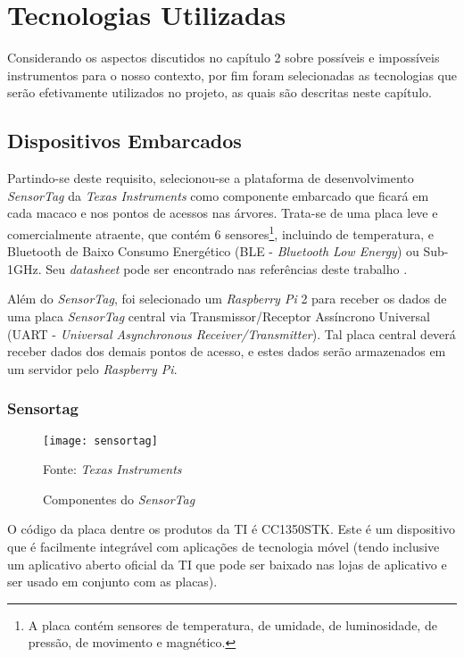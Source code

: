 \chapter{Tecnologias Utilizadas}
Considerando os aspectos discutidos no capítulo 2 sobre possíveis e impossíveis instrumentos para o nosso contexto, por fim foram selecionadas as tecnologias que serão efetivamente utilizados no projeto, as quais são descritas neste capítulo.

\section{Dispositivos Embarcados}

Partindo-se deste requisito, selecionou-se a plataforma de desenvolvimento \emph{SensorTag} da \emph{Texas Instruments} como componente embarcado que ficará em cada macaco e nos pontos de acessos nas árvores. Trata-se de uma placa leve e comercialmente atraente, que contém 6 sensores\footnote{A placa contém sensores de temperatura, de umidade, de luminosidade, de pressão, de movimento e magnético.}, incluindo de temperatura, e Bluetooth de Baixo Consumo Energético (BLE - \emph{Bluetooth Low Energy}) ou Sub-1GHz. Seu \emph{datasheet} pode ser encontrado nas referências deste trabalho \cite{datasheet}.

Além do \emph{SensorTag}, foi selecionado um \emph{Raspberry Pi} 2 para receber os dados de uma placa \emph{SensorTag} central via Transmissor/Receptor Assíncrono Universal (UART - \emph{Universal Asynchronous Receiver/Transmitter}). Tal placa central deverá receber dados dos demais pontos de acesso, e estes dados serão armazenados em um servidor pelo \emph{Raspberry Pi}.

\subsection{Sensortag}

\begin{figure}[ht]
  \centering
  \caption{Componentes do \emph{SensorTag}}
    \texttt{[image: sensortag]}
  \centerline{\small{Fonte: \emph{Texas Instruments}}}
\end{figure}

O código da placa dentre os produtos da TI é CC1350STK. Este é um dispositivo que é facilmente integrável com aplicações de tecnologia móvel (tendo inclusive um aplicativo aberto oficial da TI que pode ser baixado nas lojas de aplicativo e ser usado em conjunto com as placas).\\

